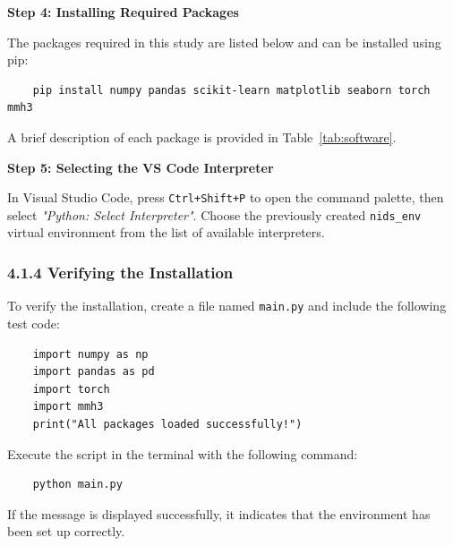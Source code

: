 \begin{ZhChapter}
    \textbf{Step 4: Installing Required Packages}

    The packages required in this study are listed below and can be installed using pip:
    \begin{verbatim}
    pip install numpy pandas scikit-learn matplotlib seaborn torch mmh3
    \end{verbatim}
    A brief description of each package is provided in Table~\ref{tab:software}.


    \textbf{Step 5: Selecting the VS Code Interpreter}

    In Visual Studio Code, press \texttt{Ctrl+Shift+P} to open the command palette, then select \textit{"Python: Select Interpreter"}. Choose the previously created \texttt{nids\_env} virtual environment from the list of available interpreters.

    \subsubsection{4.1.4 Verifying the Installation}

    To verify the installation, create a file named \texttt{main.py} and include the following test code:
    \begin{verbatim}
    import numpy as np
    import pandas as pd
    import torch
    import mmh3
    print("All packages loaded successfully!")
    \end{verbatim}

    Execute the script in the terminal with the following command:
    \begin{verbatim}
    python main.py
    \end{verbatim}

    If the message is displayed successfully, it indicates that the environment has been set up correctly.






\end{ZhChapter}